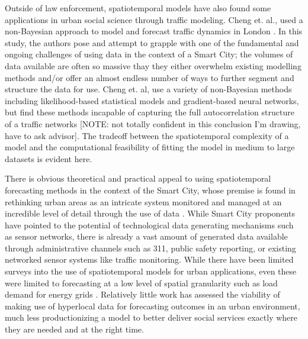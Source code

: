 \documentclass{article}
\begin{document}
Outside of law enforcement, spatiotemporal models have also found some applications in urban social science through traffic modeling. Cheng et. al., used a non-Bayesian approach to model and forecast traffic dynamics in London \cite{cheng_2012}. In this study, the authors pose and attempt to grapple with one of the fundamental and ongoing challenges of using data in the
context of a Smart City; the volumes of data available are often so massive thay they either overwhelm existing modelling methods and/or offer an almost endless number of ways to further segment and structure the data for use. Cheng et. al, use a variety of non-Bayesian methods including likelihood-based statistical models and gradient-based neural
networks, but find these methods incapable of capturing the full autocorrelation structure of a traffic networks
[NOTE: not totally confident in this conclusion I'm drawing, have to ask advisor]. The tradeoff between the spatiotemporal complexity of a model and the computational feasibility of fitting the model in medium to large datasets is evident here. \par

There is obvious theoretical and practical appeal to using spatiotemporal forecasting methods in the context of the Smart City, whose premise is found in rethinking urban areas as an intricate system monitored and managed at an incredible level of detail through the use of data \cite{kitchin_2014}. While Smart City proponents have pointed to the potential of technological data generating mechanisms such as sensor networks, there is already a vast amount of generated data available through administrative channels such as 311, public safety reporting, or existing networked sensor systems like traffic monitoring. While there have been limited surveys into the use of spatiotemporal models for urban applications, even these were limited to forecasting at a low level of spatial granularity such as load demand for energy grids \cite{tascikaraoglu_2017}. Relatively little work has assessed the viability of making use of hyperlocal data for forecasting outcomes in an urban environment, much less productionizing a model to better deliver social services exactly where they are needed and at the right time.







\end{document}
